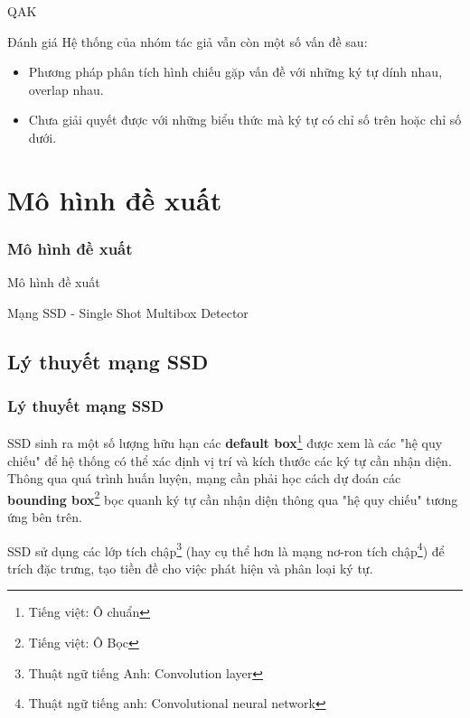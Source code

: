 \documentclass{beamer}
\begin{document}
\begin{frame}{QAK}
	\begin{block}{Đánh giá}
		Hệ thống của nhóm tác giả vẫn còn một số vấn đề sau:
		\begin{itemize}
			\item Phương pháp phân tích hình chiếu gặp vấn đề với những ký tự dính nhau, overlap nhau.
			\item Chưa giải quyết được với những biểu thức mà ký tự có chỉ số trên hoặc chỉ số dưới. 
		\end{itemize}
	\end{block}
\end{frame}

	
 \section{Mô hình đề xuất}
	\begin{frame}
		\frametitle{Mô hình đề xuất}
		{\Huge Mô hình đề xuất}
		\hspace{10 cm}
		
		
		
		
		Mạng SSD - Single Shot Multibox Detector
	\end{frame}
	
	\subsection{Lý thuyết mạng SSD}
	
	\frame{\tableofcontents[currentsection]}
	
	\begin{frame}
		\frametitle{Lý thuyết mạng SSD}
		
		SSD\cite{liu2016ssd} sinh ra một số lượng hữu hạn các \textbf{default box}\footnote{Tiếng việt: Ô chuẩn} được xem là các "hệ quy chiếu" để hệ thống có thể xác định vị trí và kích thước các ký tự cần nhận diện. Thông qua quá trình huấn luyện, mạng cần phải học cách dự đoán các \textbf{bounding box}\footnote{Tiếng việt: Ô Bọc} bọc quanh ký tự cần nhận diện thông qua "hệ quy chiếu" tương ứng bên trên.
		
		SSD\cite{liu2016ssd} sử dụng các lớp tích chập\footnote{Thuật ngữ tiếng Anh: Convolution layer} (hay cụ thể hơn là mạng nơ-ron tích chập\footnote{Thuật ngữ tiếng anh: Convolutional neural network}) để trích đặc trưng, tạo tiền đề cho việc phát hiện và phân loại ký tự. \\
		
	\end{frame}
	
\end{document}
